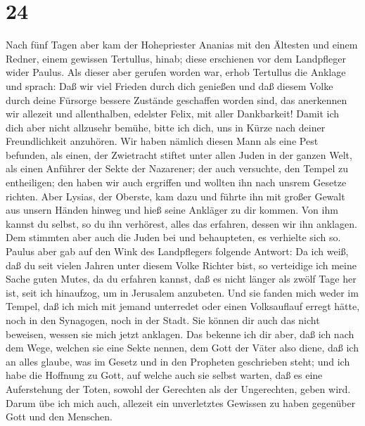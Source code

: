 \hypertarget{section-23}{%
\section{24}\label{section-23}}

 Nach fünf Tagen aber kam der Hohepriester Ananias mit den
Ältesten und einem Redner, einem gewissen Tertullus, hinab; diese
erschienen vor dem Landpfleger wider Paulus.  Als dieser
aber gerufen worden war, erhob Tertullus die Anklage und sprach:
 Daß wir viel Frieden durch dich genießen und daß diesem
Volke durch deine Fürsorge bessere Zustände geschaffen worden sind, das
anerkennen wir allezeit und allenthalben, edelster Felix, mit aller
Dankbarkeit!  Damit ich dich aber nicht allzusehr bemühe,
bitte ich dich, uns in Kürze nach deiner Freundlichkeit anzuhören.
 Wir haben nämlich diesen Mann als eine Pest befunden, als
einen, der Zwietracht stiftet unter allen Juden in der ganzen Welt, als
einen Anführer der Sekte der Nazarener;  der auch
versuchte, den Tempel zu entheiligen; den haben wir auch ergriffen und
wollten ihn nach unsrem Gesetze richten.  Aber Lysias, der
Oberste, kam dazu und führte ihn mit großer Gewalt aus unsern Händen
hinweg  und hieß seine Ankläger zu dir kommen. Von ihm
kannst du selbst, so du ihn verhörest, alles das erfahren, dessen wir
ihn anklagen.  Dem stimmten aber auch die Juden bei und
behaupteten, es verhielte sich so.  Paulus aber gab auf
den Wink des Landpflegers folgende Antwort: Da ich weiß, daß du seit
vielen Jahren unter diesem Volke Richter bist, so verteidige ich meine
Sache guten Mutes,  da du erfahren kannst, daß es nicht
länger als zwölf Tage her ist, seit ich hinaufzog, um in Jerusalem
anzubeten.  Und sie fanden mich weder im Tempel, daß ich
mich mit jemand unterredet oder einen Volksauflauf erregt hätte, noch in
den Synagogen, noch in der Stadt.  Sie können dir auch
das nicht beweisen, wessen sie mich jetzt anklagen.  Das
bekenne ich dir aber, daß ich nach dem Wege, welchen sie eine Sekte
nennen, dem Gott der Väter also diene, daß ich an alles glaube, was im
Gesetz und in den Propheten geschrieben steht;  und ich
habe die Hoffnung zu Gott, auf welche auch sie selbst warten, daß es
eine Auferstehung der Toten, sowohl der Gerechten als der Ungerechten,
geben wird.  Darum übe ich mich auch, allezeit ein
unverletztes Gewissen zu haben gegenüber Gott und den Menschen.
